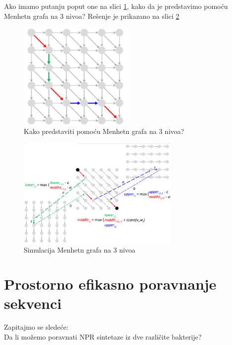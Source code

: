 Ako imamo putanju poput one na slici \ref{slika:kakoSimulirati}, kako da je predstavimo pomoću Menhetn grafa na 3 nivoa? Rešenje je prikazano na slici \ref{slika:simulacija}


\begin{figure}[h!]
\centering
\includegraphics[width=0.5\textwidth]{poglavlja/5/slike/kakoSimulirari.png}
\caption{Kako predstaviti pomoću Menhetn grafa na 3 nivoa?}
\label{slika:kakoSimulirati}
\end{figure}


\begin{figure}[h!]
\centering
\includegraphics[width=0.7\textwidth]{poglavlja/5/slike/simulacija.png}
\caption{Simulacija Menhetn grafa na 3 nivoa}
\label{slika:simulacija}
\end{figure}


\section{Prostorno efikasno poravnanje sekvenci}

Zapitajmo se sledeće: \\
Da li možemo poravnati NPR sintetaze iz dve različite bakterije? \\
\\

